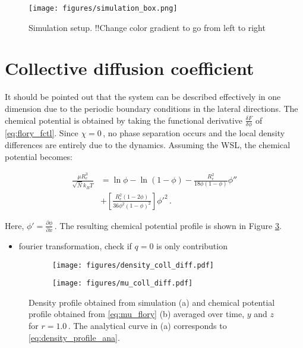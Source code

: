 \documentclass[bachelor,       %
               twoside,        %
               BCOR10mm,       %
                ngerman,english  %
               ]{GAUBM}
\begin{document}
\begin{figure}[h]
  \centering
  \texttt{[image: figures/simulation\_box.png]}
  \caption{Simulation setup. !!Change color gradient to go from left to right}
  \label{fig:simulation_box}
\end{figure}


\section{Collective diffusion coefficient}
\label{sec:colldiff}

It should be pointed out that the system can be described effectively in one dimension due to the periodic boundary conditions in the lateral directions. The chemical potential is obtained by taking the functional derivative $\frac{\delta F}{\delta\phi}$ of \eqref{eq:flory_fctl}. Since $\chi=0\,$, no phase separation occurs and the local density differences are entirely due to the dynamics. Assuming the WSL, the chemical potential becomes:


\begin{align}
  \frac{\mu R_e^3}{\sqrt{\bar N} k_BT}&=\ln\phi-\ln(1-\phi)-\frac{R_e^2}{18\phi(1-\phi)}\phi''\nonumber \\ &+\left[\frac{R_e^2(1-2\phi)}{36\phi^2(1-\phi)^2}\right]\phi'^2\,.
  \label{eq:mu_flory}
\end{align}

Here, $\phi'=\frac{\partial\phi}{\partial x}\,.$ The resulting chemical potential profile is shown in Figure \ref{fig:chemical_potential}.


\begin{itemize}
  \item fourier transformation, check if $q=0$ is only contribution
\end{itemize}

\begin{figure}[h]
  \centering
  \begin{subfigure}[b]{0.45\textwidth}
      \centering
      \texttt{[image: figures/density\_coll\_diff.pdf]}
      \caption{}
      \label{fig:density_profile}
  \end{subfigure}
  \hfill
  \begin{subfigure}[b]{0.45\textwidth}
      \centering
      \texttt{[image: figures/mu\_coll\_diff.pdf]}
      \caption{}
      \label{fig:chemical_potential}
  \end{subfigure}
     \caption{Density profile obtained from simulation (a) and chemical potential profile obtained from \eqref{eq:mu_flory} (b)  averaged over time, $y$ and $z$ for $r=1.0\,$. The analytical curve in (a) corresponds to \eqref{eq:density_profile_ana}.}
     \label{fig:mu_phi}
\end{figure}
\end{document}
